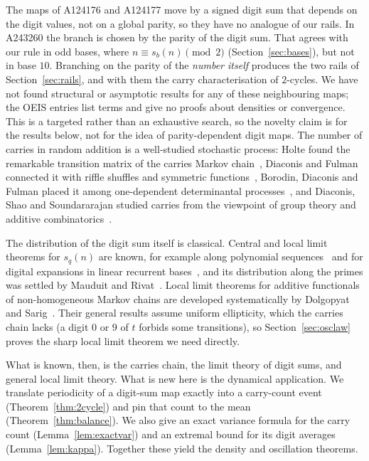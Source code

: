\documentclass[11pt]{article}
\theoremstyle{definition}
\theoremstyle{remark}
\begin{document}
The maps of A124176 and A124177 move by a signed digit sum that depends on
the digit values, not on a global parity, so they have no analogue of our
rails. In A243260 the branch is chosen by the parity of the digit sum. That
agrees with our rule in odd bases, where $n\equiv s_b(n)\pmod2$
(Section~\ref{sec:bases}), but not in base $10$. Branching on the parity of
the \emph{number itself} produces the two rails of Section~\ref{sec:rails},
and with them the carry characterisation of $2$-cycles. We have not found
structural or asymptotic results for any of these neighbouring maps; the
OEIS entries list terms and give no proofs about densities or convergence.
This is a targeted rather than an exhaustive search, so the novelty claim is
for the results below, not for the idea of parity-dependent digit maps. The number of
carries in random addition is a well-studied stochastic process: Holte found
the remarkable transition matrix of the carries Markov chain~\cite{Holte},
Diaconis and Fulman connected it with riffle shuffles and symmetric
functions~\cite{DiaconisFulman}, Borodin, Diaconis and Fulman placed it among
one-dependent determinantal processes~\cite{BorodinDiaconisFulman}, and
Diaconis, Shao and Soundararajan studied carries from the viewpoint of group
theory and additive combinatorics~\cite{DiaconisShaoSoundararajan}.

The distribution of the digit sum itself is classical. Central and local
limit theorems for $s_q(n)$ are known, for example along polynomial
sequences~\cite{BassilyKatai} and for digital expansions in linear recurrent
bases~\cite{DrmotaGajdosik}, and its distribution along the primes was
settled by Mauduit and Rivat~\cite{MauduitRivat}. Local limit theorems for
additive functionals of non-homogeneous Markov chains are developed
systematically by Dolgopyat and Sarig~\cite{DolgopyatSarig}. Their general
results assume uniform ellipticity, which the carries chain lacks (a digit
$0$ or $9$ of $t$ forbids some transitions), so Section~\ref{sec:osclaw}
proves the sharp local limit theorem we need directly.

What is known, then, is the carries chain, the limit theory of digit sums,
and general local limit theory. What is new here is the dynamical
application. We translate periodicity of a digit-sum map exactly into a
carry-count event (Theorem~\ref{thm:2cycle}) and pin that count to the mean
(Theorem~\ref{thm:balance}). We also give an exact variance formula for the
carry count (Lemma~\ref{lem:exactvar}) and an extremal bound for its digit
averages (Lemma~\ref{lem:kappa}). Together these yield the density and
oscillation theorems.
\end{document}
